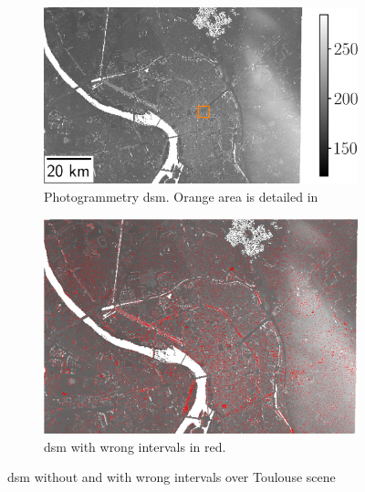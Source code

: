 \begin{figure}
    \begin{subfigure}[t]{0.549\linewidth}
        \flushleft
        \includegraphics[width=\linewidth]{Images/Chap_6/Toulouse_dsm.png}
        \caption{Photogrammetry \acrshort{dsm}. Orange area is detailed in }
        \label{fig:toulouse_dsm}
    \end{subfigure}
    \begin{subfigure}[t]{0.451\linewidth}
        \flushright
        \includegraphics[width=\linewidth]{Images/Chap_6/Toulouse_error.png}
        \caption{\acrshort{dsm} with wrong intervals in red.}
        \label{fig:toulouse_error}
    \end{subfigure}
    \caption{\acrshort{dsm} without and with wrong intervals over Toulouse scene}
    \label{fig:toulouse_global}
\end{figure}



